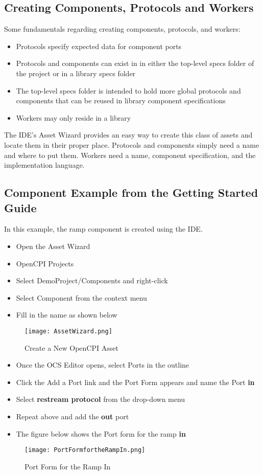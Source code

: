 \documentclass[10pt, a4paper, oneside]{article}
\begin{document}
\subsection{Creating Components, Protocols and Workers}
Some fundamentals regarding creating components, protocols, and workers:
\begin{itemize}
\item Protocols specify expected data for component ports
\item Protocols and components can exist in in either the top-level specs folder of the project or in a library specs folder
\item The top-level specs folder is intended to hold more global protocols and components that can be reused in library component specifications
\item Workers may only reside in a library
\end{itemize}
The IDE’s Asset Wizard provides an easy way to create this class of assets and locate them in their proper place. Protocols and components simply need a name and where to put them. Workers need a name, component specification, and the implementation language.
\subsection{Component Example from the Getting Started Guide}
In this example, the ramp component is created using the IDE.
\begin{itemize}
\item Open the Asset Wizard
\item OpenCPI Projects
\item Select DemoProject/Components and right-click
\item Select Component from the context menu
\item Fill in the name as shown below
\end{itemize}
\begin{figure}[h!]
	\centering
	\caption{Create a New OpenCPI Asset}\label{fig:CreateaNewOpenCPIAsset}
	\texttt{[image: AssetWizard.png]}
 \end{figure}
\begin{itemize}
\item Once the OCS Editor opens, select Ports in the outline
\item Click the Add a Port link and the Port Form appears and name the Port \textbf{in}
\item Select \textbf{restream protocol} from the drop-down menu
\item Repeat above and add the \textbf{out} port
\item The figure below shows the Port form for the ramp \textbf{in}
\end{itemize}
\begin{figure}[h!]
	\centering
	\caption{Port Form for the Ramp In}\label{fig:PortFormfortheRampIn}
	\texttt{[image: PortFormfortheRampIn.png]}
 \end{figure}
\end{document}
